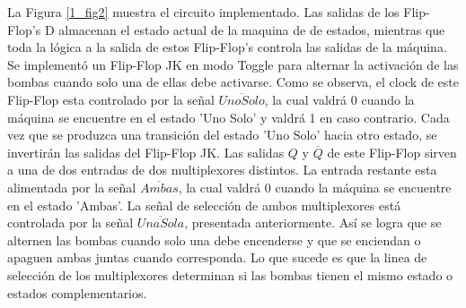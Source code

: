 \documentclass[10pt,a4paper]{article}
\begin{document}
La Figura \ref{1_fig2} muestra el circuito implementado. Las salidas de los Flip-Flop's D almacenan el estado actual de la maquina de de estados, mientras que toda la lógica a la salida de estos Flip-Flop's controla las salidas de la máquina.  Se implementó un Flip-Flop JK en modo Toggle para alternar la activación de las bombas cuando solo una de ellas debe activarse. Como se observa, el clock de este Flip-Flop esta controlado por la señal $\overline{Uno Solo}$, la cual valdrá 0 cuando la máquina se encuentre en el estado 'Uno Solo' y valdrá 1 en caso contrario. Cada vez que se produzca una transición del estado 'Uno Solo' hacia otro estado, se invertirán las salidas del Flip-Flop JK. Las salidas $Q$ y $\overline{Q}$ de este Flip-Flop sirven a una de dos entradas de dos multiplexores distintos. La entrada restante esta alimentada por la señal $\overline{Ambas}$, la cual valdrá 0 cuando la máquina se encuentre en el estado 'Ambas'. La señal de selección de ambos multiplexores está controlada por la señal $\overline{Una Sola}$, presentada anteriormente. Así se logra que se alternen las bombas cuando solo una debe encenderse y que se enciendan o apaguen ambas juntas cuando corresponda. Lo que sucede es que la linea de selección de los multiplexores determinan si las bombas tienen el mismo estado o estados complementarios.
\end{document}
